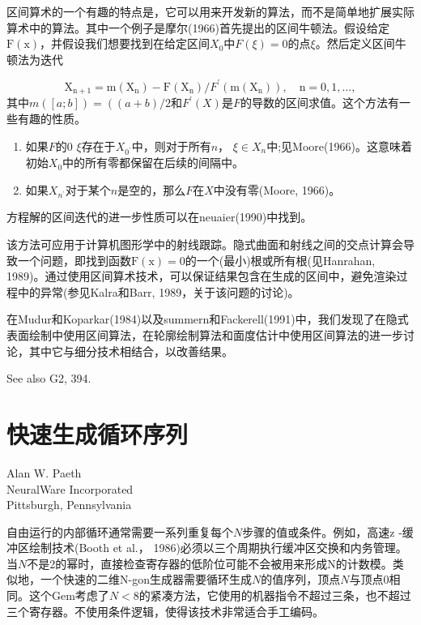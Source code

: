 \begin{CJK}{UTF8}{gbsn}
区间算术的一个有趣的特点是，它可以用来开发新的算法，而不是简单地扩展实际算术中的算法。其中一个例子是摩尔(1966)首先提出的区间牛顿法。假设给定$\mathrm{F}(\mathrm{x})$，并假设我们想要找到在给定区间$X_{0}$中$F(\xi)=0$的点$\xi$。然后定义区间牛顿法为迭代

$$
\mathrm{X}_{\mathrm{n}+1}=\mathrm{m}\left(\mathrm{X}_{\mathrm{n}}\right)-\mathrm{F}\left(\mathrm{X}_{\mathrm{n}}\right) / F^{\prime}\left(\mathrm{m}\left(\mathrm{X}_{\mathrm{n}}\right)\right), \quad \mathrm{n}=0,1, \ldots,
$$
其中$m([a ; b])=\left((a+b) / 2\right.$和$F^{\prime}(X)$是$F$的导数的区间求值。这个方法有一些有趣的性质。

\begin{enumerate}
\item 如果$F$的0 $\xi$存在于$X_{0^{\prime}}$中，则对于所有$n$， $\xi \in X_{n}$中;见Moore(1966)。这意味着初始$X_{0}$中的所有零都保留在后续的间隔中。

\item 如果$X_{n^{\prime}}$对于某个$n$是空的，那么$F$在$X$中没有零(Moore, 1966)。

\end{enumerate}

方程解的区间迭代的进一步性质可以在neuaier(1990)中找到。

该方法可应用于计算机图形学中的射线跟踪。隐式曲面和射线之间的交点计算会导致一个问题，即找到函数$\mathrm{F}(\mathrm{x})=0$的一个(最小)根或所有根(见Hanrahan, 1989)。通过使用区间算术技术，可以保证结果包含在生成的区间中，避免渲染过程中的异常(参见Kalra和Barr, 1989，关于该问题的讨论)。

在Mudur和Koparkar(1984)以及summern和Fackerell(1991)中，我们发现了在隐式表面绘制中使用区间算法，在轮廓绘制算法和面度估计中使用区间算法的进一步讨论，其中它与细分技术相结合，以改善结果。

See also G2, 394.


\newpage
\section{快速生成循环序列}
\begin{center}
\small{
Alan W. Paeth\\
NeuralWare Incorporated\\
Pittsburgh, Pennsylvania}
\end{center}

自由运行的内部循环通常需要一系列重复每个$N$步骤的值或条件。例如，高速z -缓冲区绘制技术(Booth et al.， 1986)必须以三个周期执行缓冲区交换和内务管理。当$N$不是2的幂时，直接检查寄存器的低阶位可能不会被用来形成N的计数模。类似地，一个快速的二维N-gon生成器需要循环生成$N$的值序列，顶点$N$与顶点0相同。这个Gem考虑了$N<8$的紧凑方法，它使用的机器指令不超过三条，也不超过三个寄存器。不使用条件逻辑，使得该技术非常适合手工编码。


\end{CJK}
